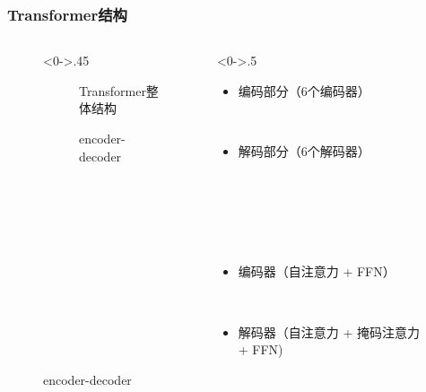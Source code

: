 \documentclass[10pt,t,handout]{beamer}
\begin{document}
\begin{frame}
\frametitle{Transformer结构}
\begin{figure}
	\begin{columns}[T] %
		\begin{column}<0->{.45\textwidth}
			\begin{figure}[thpb]
				\centering
				\caption{Transformer整体结构}
				\label{fig:m}
			\end{figure}
			\begin{figure}[thpb]
				\centering
				\caption{encoder-decoder}
				\label{fimps}
			\end{figure}
		\end{column}
		\hfill
		\begin{column}<0->{.5\textwidth}
			\begin{itemize}
			 
				\item<1->  编码部分（6个编码器）
				
				\
				\item<2->	解码部分（6个解码器）
				
				\
				
				\
				
				\
				
				\item<3->  编码器（自注意力 + FFN） 
				
				\
				\item<4->解码器（自注意力 + 掩码注意力 + FFN)
			 
				
			\end{itemize}
		\end{column}%
	\end{columns}
\end{figure}
\end{frame}
\end{document}
